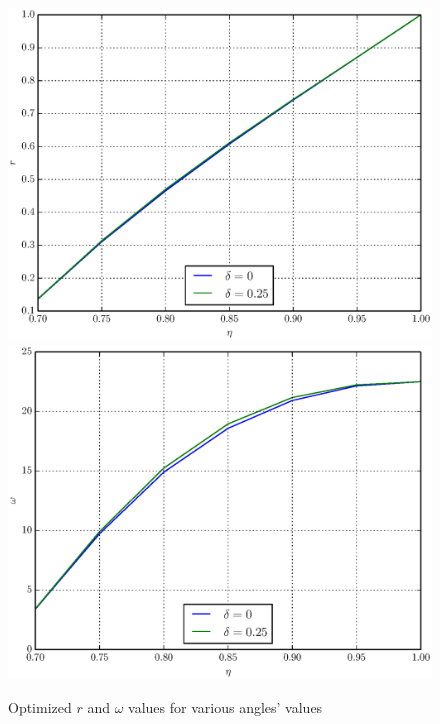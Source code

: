 \documentclass[%
master,         %
subf,           %
href,           %
colorlinks=true %
]{disser}
\numberwithin{equation}{section}
\numberwithin{figure}{section}
\begin{document}
\begin{figure}[h]
\includegraphics[scale=0.7]{r_4ang.eps}
\includegraphics[scale=0.7]{omega_4ang.eps}
\caption{Optimized $r$ and $\omega$ values for various angles' values}
\label{fig:psi_4ang}
\end{figure}
\end{document}
